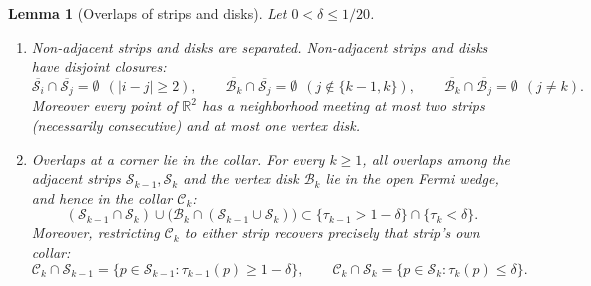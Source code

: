 \documentclass[11pt]{article}
\newtheorem{lemma}[theorem]{Lemma}
\newcommand{\R}{\mathbb{R}}
\begin{document}
\begin{lemma}[Overlaps of strips and disks]
\label{lem:seam}
Let $0 < \delta \le 1/20$.
\begin{enumerate}
\item[(i)] \emph{Non-adjacent strips and disks are separated.}
Non-adjacent strips and disks have disjoint closures:
\[
\overline{\mathcal S_i} \cap \overline{\mathcal S_j} = \emptyset \ \ (|i-j| \ge 2), \qquad
\overline{\mathcal B_k} \cap \overline{\mathcal S_j} = \emptyset \ \ (j \notin \{k-1, k\}), \qquad
\overline{\mathcal B_k} \cap \overline{\mathcal B_j} = \emptyset \ \ (j \ne k).
\]
Moreover every point of $\R^2$ has a neighborhood meeting at most two strips (necessarily consecutive) and at most one vertex disk.
\item[(ii)] \emph{Overlaps at a corner lie in the collar.}
For every $k \ge 1$, all overlaps among the adjacent strips $\mathcal S_{k-1}, \mathcal S_k$ and the vertex disk $\mathcal B_k$ lie in the open Fermi wedge, and hence in the collar $\mathcal C_k$:
\begin{equation}
\label{eq:cornerincl}
(\mathcal S_{k-1} \cap \mathcal S_k) \cup \bigl(\mathcal B_k \cap (\mathcal S_{k-1} \cup \mathcal S_k)\bigr) \subset \{\tau_{k-1}>1-\delta\}\cap\{\tau_k<\delta\}.
\end{equation}
Moreover, restricting $\mathcal C_k$ to either strip recovers precisely that strip's own collar:
\begin{equation}
\label{eq:Ckrest}
\mathcal C_k \cap \mathcal S_{k-1} = \{p \in \mathcal S_{k-1} : \tau_{k-1}(p) \ge 1-\delta\}, \qquad
\mathcal C_k \cap \mathcal S_k = \{p \in \mathcal S_k : \tau_k(p) \le \delta\}.
\end{equation}
\end{enumerate}
\end{lemma}
\end{document}
